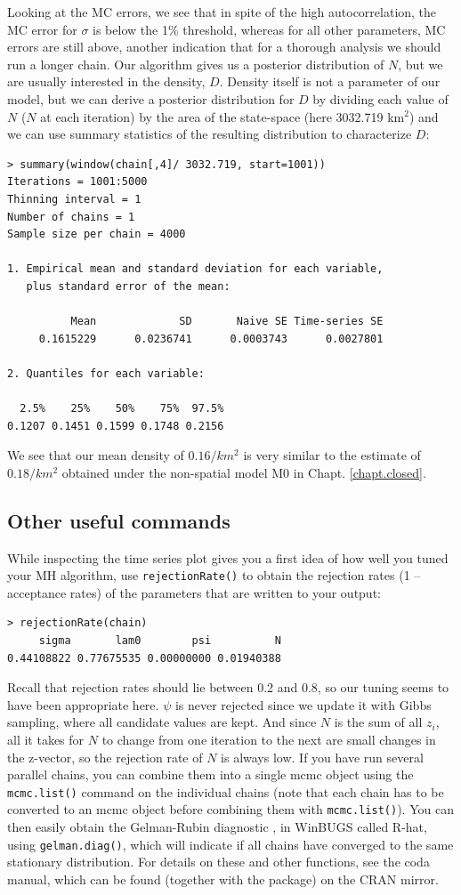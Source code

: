 Looking at the MC errors, we see that in spite of the high autocorrelation, the MC error for $\sigma$ is below the 1\% threshold, whereas for all other parameters, MC errors are still above, another indication that for a thorough analysis we should run a longer chain.
Our algorithm gives us a posterior distribution of $N$, but we are usually interested in the density, $D$. Density itself is not a parameter of our model, but we can derive a posterior distribution for $D$ by dividing each value of $N$ ($N$ at each iteration) by the area of the state-space (here 3032.719 km$^2$) and we can use summary statistics of the resulting distribution to characterize $D$:
\begin{verbatim}
> summary(window(chain[,4]/ 3032.719, start=1001))
Iterations = 1001:5000
Thinning interval = 1
Number of chains = 1
Sample size per chain = 4000

1. Empirical mean and standard deviation for each variable,
   plus standard error of the mean:

          Mean             SD       Naive SE Time-series SE
     0.1615229      0.0236741      0.0003743      0.0027801

2. Quantiles for each variable:

  2.5%    25%    50%    75%  97.5%
0.1207 0.1451 0.1599 0.1748 0.2156
\end{verbatim}
We see that our mean density of $0.16/km^2$ is very similar to the estimate of $0.18/km^2$ obtained under the non-spatial model M0 in Chapt. \ref{chapt.closed}.


\subsection{Other useful commands }
While inspecting the time series plot gives you a first idea of how well you tuned your MH algorithm, use \verb#rejectionRate()# to obtain the rejection rates (1 -- acceptance rates) of the parameters that are written to your output:
\begin{verbatim}
> rejectionRate(chain)
     sigma       lam0        psi          N
0.44108822 0.77675535 0.00000000 0.01940388
\end{verbatim}
 Recall that rejection rates should lie between 0.2 and 0.8, so our tuning seems to have been appropriate here. $\psi$ is never rejected since we update it with Gibbs sampling, where all candidate values are kept. And since $N$ is the sum of all $z_i$, all it takes for $N$ to change from one iteration to the next are small changes in the z-vector, so the rejection rate of $N$ is always low.
If you have run several parallel chains, you can combine them into a single mcmc object using the \verb#mcmc.list()# command on the individual chains (note that each chain has to be converted to an mcmc object before combining them with \verb#mcmc.list()#). You can then easily obtain the Gelman-Rubin diagnostic \citep{gelman_etal:2004}, in WinBUGS called R-hat, using \verb#gelman.diag()#, which will indicate if all chains have converged to the same stationary distribution.
For details on these and other functions, see the coda manual, which can be found (together with the package) on the CRAN mirror.

